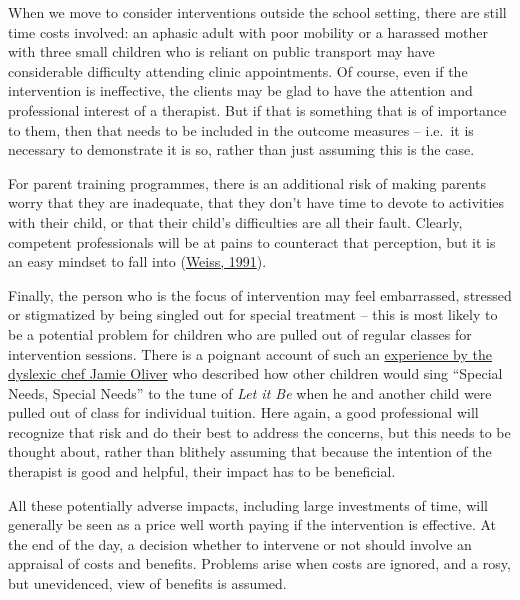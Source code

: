 \documentclass{krantz}
\begin{document}

When we move to consider interventions outside the school setting, there are still time costs involved: an aphasic adult with poor mobility or a harassed mother with three small children who is reliant on public transport may have considerable difficulty attending clinic appointments. Of course, even if the intervention is ineffective, the clients may be glad to have the attention and professional interest of a therapist. But if that is something that is of importance to them, then that needs to be included in the outcome measures -- i.e.~it is necessary to demonstrate it is so, rather than just assuming this is the case.

For parent training programmes, there is an additional risk of making parents worry that they are inadequate, that they don't have time to devote to activities with their child, or that their child's difficulties are all their fault. Clearly, competent professionals will be at pains to counteract that perception, but it is an easy mindset to fall into (\protect\hyperlink{ref-weiss1991}{Weiss, 1991}).

Finally, the person who is the focus of intervention may feel embarrassed, stressed or stigmatized by being singled out for special treatment -- this is most likely to be a potential problem for children who are pulled out of regular classes for intervention sessions. There is a poignant account of such an \href{https://www.standard.co.uk/news/celebritynews/school-labelled-me-as-special-needs-says-chef-jamie-oliver-who-suffers-from-dyslexia-9033901.html}{experience by the dyslexic chef Jamie Oliver} who described how other children would sing ``Special Needs, Special Needs'' to the tune of \emph{Let it Be} when he and another child were pulled out of class for individual tuition. Here again, a good professional will recognize that risk and do their best to address the concerns, but this needs to be thought about, rather than blithely assuming that because the intention of the therapist is good and helpful, their impact has to be beneficial.   

All these potentially adverse impacts, including large investments of time, will generally be seen as a price well worth paying if the intervention is effective. At the end of the day, a decision whether to intervene or not should involve an appraisal of costs and benefits. Problems arise when costs are ignored, and a rosy, but unevidenced, view of benefits is assumed.
\end{document}

